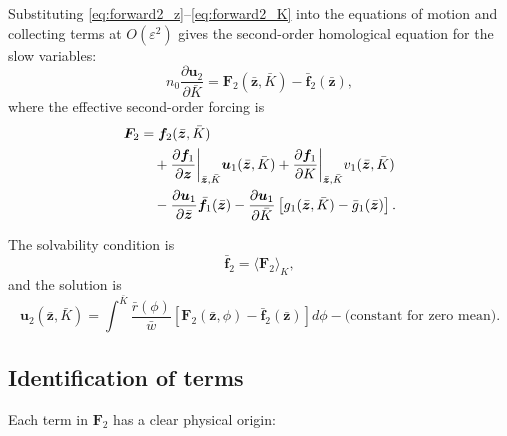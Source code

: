 \documentclass[11pt]{article}
\newcommand{\eps}{\varepsilon}
\newcommand{\mean}[1]{\langle #1 \rangle}
\begin{document}
Substituting \eqref{eq:forward2_z}--\eqref{eq:forward2_K} into the equations
of motion and collecting terms at $O(\eps^2)$ gives the second-order
homological equation for the slow variables:
\begin{equation}
\boxed{
n_0 \frac{\partial \bm u_2}{\partial \bar K}
= \bm F_2(\bar{\bm z}, \bar K)
- \bar{\bm f}_2(\bar{\bm z}),
}
\label{eq:homological2}
\end{equation}
where the effective second-order forcing is
\begin{align}
\bm F_2
&= \bm f_2(\bar{\bm z}, \bar K)
\notag\\
&\quad
+ \frac{\partial \bm f_1}{\partial \bm z}\bigg|_{\bar{\bm z}, \bar K}
  \bm u_1(\bar{\bm z}, \bar K)
+ \frac{\partial \bm f_1}{\partial K}\bigg|_{\bar{\bm z}, \bar K}
  v_1(\bar{\bm z}, \bar K)
\notag\\
&\quad
- \frac{\partial \bm u_1}{\partial \bar{\bm z}}
  \bar{\bm f}_1(\bar{\bm z})
- \frac{\partial \bm u_1}{\partial \bar K}
  \left[
    g_1(\bar{\bm z}, \bar K) - \bar g_1(\bar{\bm z})
  \right].
\label{eq:F2_forcing}
\end{align}

The solvability condition is
\begin{equation}
\bar{\bm f}_2 = \mean{\bm F_2}_K,
\label{eq:solvability2}
\end{equation}
and the solution is
\begin{equation}
\bm u_2(\bar{\bm z}, \bar K)
= \int^{\bar K}
\frac{\bar r(\phi)}{\bar w}
\left[
\bm F_2(\bar{\bm z}, \phi)
- \bar{\bm f}_2(\bar{\bm z})
\right] d\phi
- \text{(constant for zero mean)}.
\label{eq:u2_integral}
\end{equation}

\subsection{Identification of terms}

Each term in $\bm F_2$ has a clear physical origin:
\end{document}
